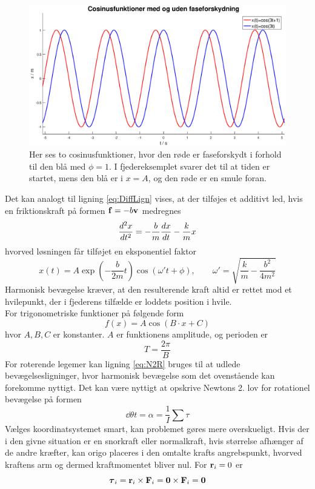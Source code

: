 \begin{figure}[h!]
\centering
\includegraphics[width=.85\textwidth]{RotationelMekanik/Faseforskydning.eps}
\caption{Her ses to cosinusfunktioner, hvor den røde er faseforskydt i forhold til den blå med $\phi=1$. I fjedereksemplet svarer det til at tiden er startet, mens den blå er i $x=A$, og den røde er en smule foran.}
\label{fig:Faseforskydning}
\end{figure}
Det kan analogt til ligning \ref{eq:DiffLign} vises, at der tilføjes et additivt led, hvis en friktionskraft på formen $\mathbf{f}=-b\mathbf{v}$ medregnes
\begin{equation}
    {d^2{x} \over d{t}^2} = -\frac{b}{m}{d{x} \over d{t}} - \frac{k}{m}x
\end{equation}
hvorved løsningen får tilføjet en eksponentiel faktor
\begin{equation}
x(t) = A\exp\left(-\frac{b}{2m}t\right)\cos\left(\omega' t + \phi\right), \qquad \omega' = \sqrt{\frac{k}{m}-\frac{b^2}{4m^2}}
\end{equation}
Harmonisk bevægelse kræver, at den resulterende kraft altid er rettet mod et hvilepunkt, der i fjederens tilfælde er loddets position i hvile. \\
For trigonometriske funktioner på følgende form
\begin{equation}
    f(x) = A\cos(B\cdot x + C)
\end{equation}
hvor $A,B,C$ er konstanter. $A$ er funktionens amplitude, og perioden er
\begin{equation}
    T = \frac{2\pi}{B}
\end{equation}
For roterende legemer kan ligning \ref{eq:N2R} bruges til at udlede bevægelsesligninger, hvor harmonisk bevægelse som det ovenstående kan forekomme nyttigt. Det kan være nyttigt at opskrive Newtons 2. lov for rotationel bevægelse på formen
\begin{equation}
    \dd{\theta}{t} = \alpha = \frac{1}{I}\sum\tau
\end{equation}
Vælges koordinatsystemet smart, kan problemet gøres mere overskueligt. Hvis der i den givne situation er en snorkraft eller normalkraft, hvis størrelse afhænger af de andre kræfter, kan origo placeres i den omtalte krafts angrebspunkt, hvorved kraftens arm og dermed kraftmomentet bliver nul. For $\mathbf{r}_i=0$ er
\begin{equation}
    \mbox{\boldmath$ \tau $}_i = \mathbf{r}_i \times \mathbf{F}_i = \mathbf{0} \times \mathbf{F}_i = \mathbf{0}
\end{equation}
